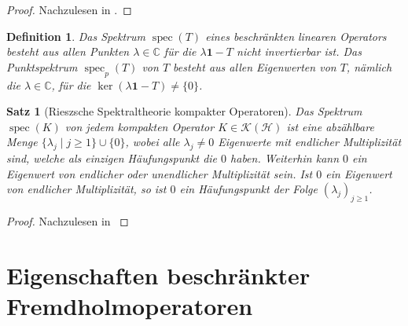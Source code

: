 \documentclass[11pt, hidelinks]{article}
\newcommand{\h}{\mathcal{H}}
\newcommand{\spec}{\operatorname{spec}}
\numberwithin{conj}{section}
\newtheorem{definition}[conj]{Definition}
\newtheorem{theorem}[conj]{Satz}
\begin{document}
\begin{proof}
Nachzulesen in \cite[Satz VI.2.1, Lemma VI.2.2]{werner2018funktionalanalysis}.
\end{proof}

\begin{definition}
    Das Spektrum $\spec(T)$ eines beschränkten linearen Operators besteht aus allen Punkten $\lambda \in \mathbb{C}$ für die $\lambda \mathbf{1} - T$ nicht invertierbar ist. Das Punktspektrum $\spec_p(T)$ von $T$ besteht aus allen Eigenwerten von $T$, nämlich die $\lambda \in \mathbb{C}$, für die $\ker(\lambda \mathbf{1} - T) \neq \{0\}$.
\end{definition}

\begin{theorem}[Rieszsche Spektraltheorie kompakter Operatoren]
\label{Riesz}
Das Spektrum $\spec(K)$ von jedem kompakten Operator $K \in \mathcal{K}(\h)$ ist eine abzählbare Menge $\{\lambda_j \; \vert \; j \geq 1\} \cup \{0\}$, wobei alle $\lambda_j \neq 0$ Eigenwerte mit endlicher Multiplizität sind, welche als einzigen Häufungspunkt die $0$ haben. Weiterhin kann $0$ ein Eigenwert von endlicher oder unendlicher Multiplizität sein. Ist $0$ ein Eigenwert von endlicher Multiplizität, so ist $0$ ein Häufungspunkt der Folge $(\lambda_j)_{j \geq 1}$.
\end{theorem}

\begin{proof}
Nachzulesen in \cite[VI.2.5]{werner2018funktionalanalysis}
\end{proof}

\section{Eigenschaften beschränkter Fremdholmoperatoren}
\end{document}
